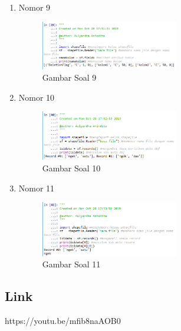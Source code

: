 \begin{enumerate}
 \item Nomor 9
 
 \begin{figure}[H]
  \includegraphics[width=6cm]{figures/Tugas3/1174054/no9.png}
  \centering
  \caption{Gambar Soal 9}
 \end{figure}
 \item Nomor 10
 
 \begin{figure}[H]
  \includegraphics[width=6cm]{figures/Tugas3/1174054/no10.png}
  \centering
  \caption{Gambar Soal 10 }
 \end{figure}
 \item Nomor 11
 
 \begin{figure}[H]
  \includegraphics[width=6cm]{figures/Tugas3/1174054/no11.png}
  \centering
  \caption{Gambar Soal 11 }
 \end{figure}
\end{enumerate}
\subsection{Link}
https://youtu.be/mfib8naAOB0